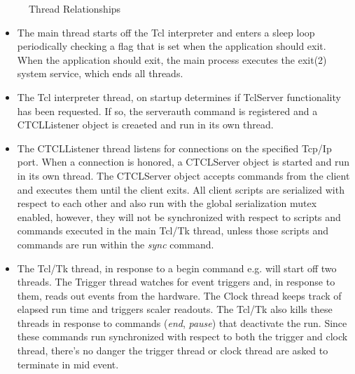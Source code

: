       	 \begin{figure}[htb]
	    \caption{Thread Relationships}

	 \end{figure}

      \begin{itemize}
	 \item The main thread starts off the Tcl interpreter and
	    enters a sleep loop periodically checking a flag that
	    is set when the application should exit.  When the application
	    should exit, the main process executes the exit(2) system 
	    service, which ends all threads.
	 \item The Tcl interpreter thread, on startup determines if TclServer
	    functionality has been requested.  If so, the serverauth command
	    is registered and a CTCLListener object is creaeted and run
	    in its own thread.
	 \item The CTCLListener thread listens for connections on the
	    specified Tcp/Ip port.  When a connection is honored, a 
	    CTCLServer object is started and run in its own thread. 
	    The CTCLServer object accepts commands from the client
	    and executes them until the client exits.  All client scripts
	    are serialized with respect to each other and also run with
	    the global serialization mutex enabled, however, they will
	    not be synchronized with respect to scripts and commands 
	    executed in the main Tcl/Tk thread, unless those scripts and
	    commands are run within the {\em sync} command.
	 \item The Tcl/Tk thread, in response to a begin command e.g. will
	 start off two threads.  The Trigger thread watches for event triggers
	 and, in response to them, reads out events from the hardware.
	 The Clock thread keeps track of elapsed run time and triggers scaler
	 readouts.  The Tcl/Tk also kills these threads in response to commands
	 ({\em end}, {\em pause}) that deactivate the run.  Since these 
	 commands run synchronized with respect to both the trigger and clock
	 thread, there's no danger the trigger thread or clock thread are
	 asked to terminate in mid event.
      \end{itemize}
      
